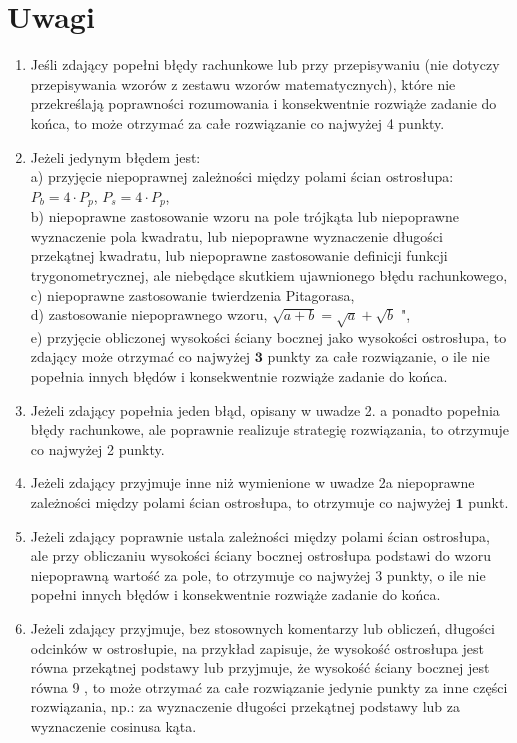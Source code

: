 \documentclass[10pt]{article}
\begin{document}
\section*{Uwagi}
\begin{enumerate}
  \item Jeśli zdający popełni błędy rachunkowe lub przy przepisywaniu (nie dotyczy przepisywania wzorów z zestawu wzorów matematycznych), które nie przekreślają poprawności rozumowania i konsekwentnie rozwiąże zadanie do końca, to może otrzymać za całe rozwiązanie co najwyżej 4 punkty.
  \item Jeżeli jedynym błędem jest:\\
a) przyjęcie niepoprawnej zależności między polami ścian ostrosłupa: $P_{b}=4 \cdot P_{p}$, $P_{s}=4 \cdot P_{p}$,\\
b) niepoprawne zastosowanie wzoru na pole trójkąta lub niepoprawne wyznaczenie pola kwadratu, lub niepoprawne wyznaczenie długości przekątnej kwadratu, lub niepoprawne zastosowanie definicji funkcji trygonometrycznej, ale niebędące skutkiem ujawnionego błędu rachunkowego,\\
c) niepoprawne zastosowanie twierdzenia Pitagorasa,\\
d) zastosowanie niepoprawnego wzoru, $\sqrt{a+b}=\sqrt{a}+\sqrt{b}$ ",\\
e) przyjęcie obliczonej wysokości ściany bocznej jako wysokości ostrosłupa, to zdający może otrzymać co najwyżej $\mathbf{3}$ punkty za całe rozwiązanie, o ile nie popełnia innych błędów i konsekwentnie rozwiąże zadanie do końca.
  \item Jeżeli zdający popełnia jeden błąd, opisany w uwadze 2. a ponadto popełnia błędy rachunkowe, ale poprawnie realizuje strategię rozwiązania, to otrzymuje co najwyżej 2 punkty.
  \item Jeżeli zdający przyjmuje inne niż wymienione w uwadze 2a niepoprawne zależności między polami ścian ostrosłupa, to otrzymuje co najwyżej $\mathbf{1}$ punkt.
  \item Jeżeli zdający poprawnie ustala zależności między polami ścian ostrosłupa, ale przy obliczaniu wysokości ściany bocznej ostrosłupa podstawi do wzoru niepoprawną wartość za pole, to otrzymuje co najwyżej 3 punkty, o ile nie popełni innych błędów i konsekwentnie rozwiąże zadanie do końca.
  \item Jeżeli zdający przyjmuje, bez stosownych komentarzy lub obliczeń, długości odcinków w ostrosłupie, na przykład zapisuje, że wysokość ostrosłupa jest równa przekątnej podstawy lub przyjmuje, że wysokość ściany bocznej jest równa 9 , to może otrzymać za całe rozwiązanie jedynie punkty za inne części rozwiązania, np.: za wyznaczenie długości przekątnej podstawy lub za wyznaczenie cosinusa kąta.
\end{enumerate}
\end{document}
